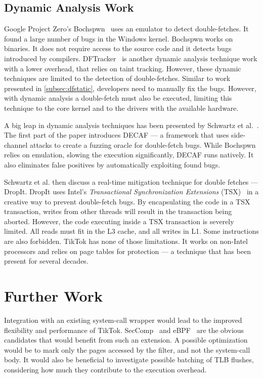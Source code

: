 \documentclass[conference]{IEEEtran}
\newcommand{\sysname}{TikTok}
\begin{document}
\subsection{Dynamic Analysis Work}
\label{subsec:dfdynamic}
Google Project Zero's Bochspwn~\cite{jurczyk2013bochspwn} uses an emulator to
detect double-fetches. It found a large number of bugs in the Windows kernel.
Bochspwn works on binaries. It does not require access to the source code and it
detects bugs introduced by compilers. DFTracker~\cite{wang2019dftracker} is
another dynamic analysis technique work with a lower overhead, that relies on
taint tracking. However, these dynamic techniques are limited to the detection
of double-fetches. Similar to work presented in \autoref{subsec:dfstatic},
developers need to manually fix the bugs. However, with dynamic analysis a
double-fetch must also be executed, limiting this technique to the core kernel
and to the drivers with the available hardware.

A big leap in dynamic analysis techniques has been presented by Schwartz et
al.~\cite{schwarz2018automated}. The first part of the paper introduces DECAF
--- a framework that uses side-channel attacks to create a fuzzing oracle for
double-fetch bugs. While Bochspwn relies on emulation, slowing the execution
significantly, DECAF runs natively. It also eliminates false positives by
automatically exploiting found bugs.

Schwartz et al. then discuss a real-time mitigation technique for double fetches
--- DropIt. DropIt uses Intel's \emph{Transactional Synchronization Extensions}
(TSX)~\cite{intel64and} in a creative way to prevent double-fetch bugs. By
encapsulating the code in a TSX transaction, writes from other threads will
result in the transaction being aborted. However, the code executing inside a
TSX transaction is severely limited. All reads must fit in the L3 cache, and all
writes in L1. Some instructions are also forbidden. \sysname{} has none of those
limitations. It works on non-Intel processors and relies on page tables for
protection --- a technique that has been present for several decades.

\section{Further Work}
\label{sec:furtherwork}
Integration with an existing system-call wrapper would lead to the improved
flexibility and performance of \sysname. SecComp~\cite{seccomp} and
eBPF~\cite{ebpf} are the obvious candidates that would benefit from such an
extension. A possible optimization would be to mark only the pages accessed by
the filter, and not the system-call body. It would also be beneficial to
investigate possible batching of TLB flushes, considering how much they
contribute to the execution overhead.
\end{document}
